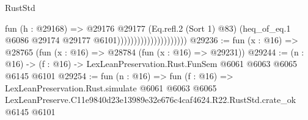 \begin{lexlean}{RustStd}
\begin{coremodule}
                                          fun (h : @29168) =>
                                          @29176
                                            @29177
                                            (Eq.refl.{2} (Sort 1) @83)
                                            (heq_of_eq.{1}
                                              @6086
                                              @29174
                                              @29177
                                              @6101)))))))))))))))))))))
@29236 := fun (x : @16) => @28765 (fun (x : @16) => @28784 (fun (x : @16) => @29231))
@29244 := (n : @16) -> (f : @16) -> LexLeanPreservation.Rust.FunSem @6061 @6063 @6065 @6145 @6101
@29254 := fun (n : @16) =>
  fun (f : @16) =>
  LexLeanPreservation.Rust.simulate
    @6061
    @6063
    @6065
    LexLeanPreserve.C11e9840d23e13989e32e676c4caf4624.R22.RustStd.crate_ok
    @6145
    @6101
\end{coremodule}
\end{lexlean}
